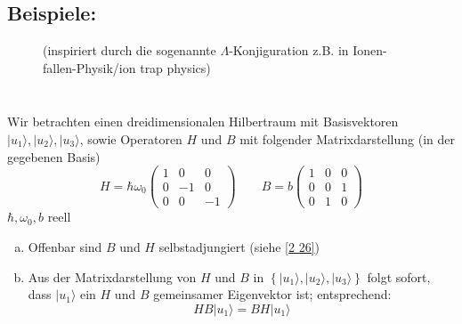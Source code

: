 \subsection{Beispiele:}

\FloatBarrier

\begin{figure}[ht]
	\begin{minipage}{.5\linewidth}
	(inspiriert durch die sogenannte $ \Lambda $-Konjiguration z.B. in Ionen-fallen-Physik/ion trap physics)
	\end{minipage}%
	\begin{minipage}{.15\linewidth}
		$ \phantom{look behind you} $
	\end{minipage}%
	\begin{minipage}{.35\linewidth}
	\flushright
	\end{minipage}%
\end{figure}

\noindent
Wir betrachten einen dreidimensionalen Hilbertraum mit Basisvektoren $ |u_1\rangle, | u_2\rangle, | u_3 \rangle $, sowie Operatoren $ H $ und $ B $ mit folgender Matrixdarstellung (in der gegebenen Basis)
\begin{equation}
H = \hbar \omega_0 \begin{pmatrix}
1 & 0 & 0 \\ 0 & -1 & 0 \\ 0 & 0 & -1
\end{pmatrix} \qquad B = b \begin{pmatrix}
1 & 0 & 0 \\ 0 & 0 & 1 \\ 0 & 1 & 0
\end{pmatrix}
\label{2 34}
\end{equation}
$ \hbar, \omega_0, b $ reell
\begin{enumerate}[(a)]
	\item Offenbar sind $ B $ und $ H $ selbstadjungiert (siehe \eqref{2 26})
	\item Aus der Matrixdarstellung von $ H $ und $ B $ in $ \left\{ |u_1 \rangle , |u_2 \rangle , | u_3 \rangle \right\} $ folgt sofort, dass $ | u_1 \rangle $ ein $ H $ und $ B $ gemeinsamer Eigenvektor ist; entsprechend:
	\begin{equation}
	HB|u_1\rangle = BH |u_1 \rangle
	\label{2 35}
	\end{equation}
\end{enumerate}

